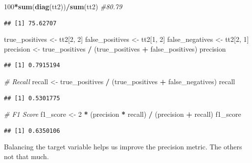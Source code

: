 \documentclass[
  twoside]{article}
\newenvironment{Shaded}{\begin{snugshade}}{\end{snugshade}}
\newcommand{\CommentTok}[1]{\textcolor[rgb]{0.56,0.35,0.01}{\textit{#1}}}
\newcommand{\DecValTok}[1]{\textcolor[rgb]{0.00,0.00,0.81}{#1}}
\newcommand{\FunctionTok}[1]{\textcolor[rgb]{0.13,0.29,0.53}{\textbf{#1}}}
\newcommand{\NormalTok}[1]{#1}
\newcommand{\OtherTok}[1]{\textcolor[rgb]{0.56,0.35,0.01}{#1}}
\newcommand{\SpecialCharTok}[1]{\textcolor[rgb]{0.81,0.36,0.00}{\textbf{#1}}}
\begin{document}
\begin{Shaded}
\begin{Highlighting}[]
\DecValTok{100}\SpecialCharTok{*}\FunctionTok{sum}\NormalTok{(}\FunctionTok{diag}\NormalTok{(tt2))}\SpecialCharTok{/}\FunctionTok{sum}\NormalTok{(tt2) }\CommentTok{\#80.79}
\end{Highlighting}
\end{Shaded}

\begin{verbatim}
## [1] 75.62707
\end{verbatim}

\begin{Shaded}
\begin{Highlighting}[]
\NormalTok{true\_positives }\OtherTok{\textless{}{-}}\NormalTok{ tt2[}\DecValTok{2}\NormalTok{, }\DecValTok{2}\NormalTok{]}
\NormalTok{false\_positives }\OtherTok{\textless{}{-}}\NormalTok{ tt2[}\DecValTok{1}\NormalTok{, }\DecValTok{2}\NormalTok{]}
\NormalTok{false\_negatives }\OtherTok{\textless{}{-}}\NormalTok{ tt2[}\DecValTok{2}\NormalTok{, }\DecValTok{1}\NormalTok{]}
\NormalTok{precision }\OtherTok{\textless{}{-}}\NormalTok{ true\_positives }\SpecialCharTok{/}\NormalTok{ (true\_positives }\SpecialCharTok{+}\NormalTok{ false\_positives)}
\NormalTok{precision}
\end{Highlighting}
\end{Shaded}

\begin{verbatim}
## [1] 0.7915194
\end{verbatim}

\begin{Shaded}
\begin{Highlighting}[]
\CommentTok{\# Recall}
\NormalTok{recall }\OtherTok{\textless{}{-}}\NormalTok{ true\_positives }\SpecialCharTok{/}\NormalTok{ (true\_positives }\SpecialCharTok{+}\NormalTok{ false\_negatives)}
\NormalTok{recall}
\end{Highlighting}
\end{Shaded}

\begin{verbatim}
## [1] 0.5301775
\end{verbatim}

\begin{Shaded}
\begin{Highlighting}[]
\CommentTok{\# F1 Score}
\NormalTok{f1\_score }\OtherTok{\textless{}{-}} \DecValTok{2} \SpecialCharTok{*}\NormalTok{ (precision }\SpecialCharTok{*}\NormalTok{ recall) }\SpecialCharTok{/}\NormalTok{ (precision }\SpecialCharTok{+}\NormalTok{ recall)}
\NormalTok{f1\_score}
\end{Highlighting}
\end{Shaded}

\begin{verbatim}
## [1] 0.6350106
\end{verbatim}

Balancing the target variable helps us improve the precision metric. The
others not that much.
\end{document}
